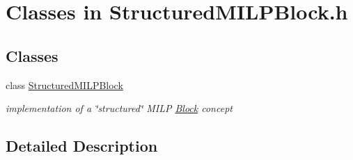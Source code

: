 \hypertarget{group___structured_m_i_l_p_block___c_l_a_s_s_e_s}{}\section{Classes in Structured\+M\+I\+L\+P\+Block.\+h}
\label{group___structured_m_i_l_p_block___c_l_a_s_s_e_s}
\subsection*{Classes}
\begin{DoxyCompactItemize}
\item 
class \mbox{\hyperlink{class_s_m_spp__di__unipi__it_1_1_structured_m_i_l_p_block}{Structured\+M\+I\+L\+P\+Block}}
\begin{DoxyCompactList}\small\item\em implementation of a \char`\"{}structured\char`\"{} M\+I\+LP \mbox{\hyperlink{class_s_m_spp__di__unipi__it_1_1_block}{Block}} concept \end{DoxyCompactList}\end{DoxyCompactItemize}


\subsection{Detailed Description}
